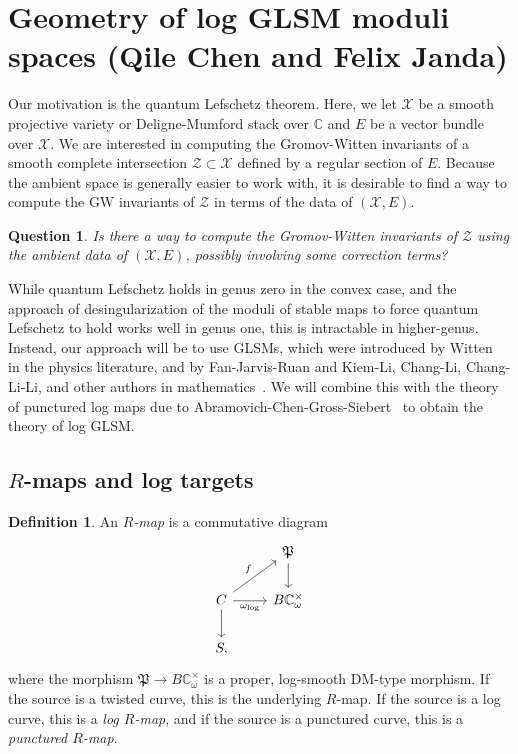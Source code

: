 \documentclass[10pt]{amsart}
\newtheorem{quest}[thm]{Question}
\theoremstyle{definition}
\newtheorem{defn}[thm]{Definition}
\theoremstyle{remark}
\theoremstyle{plain}
\theoremstyle{definition}
\theoremstyle{remark}
\newcommand{\C}{\mathbb{C}}
\newcommand{\mc}[1]{\mathcal{#1}}
\newcommand{\mf}[1]{\mathfrak{#1}}
\newcommand{\1}{\mathbf{1}}
\newcommand{\2}{\mathbf{2}}
\newcommand{\3}{\mathbf{3}}
\begin{document}
\section{Geometry of log GLSM moduli spaces (Qile Chen and Felix Janda)}%
\label{sec:Foundationslogglsm}

Our motivation is the quantum Lefschetz theorem. Here, we let $\mc{X}$ be a smooth projective variety or Deligne-Mumford stack over $\C$ and $E$ be a vector bundle over $\mc{X}$. We are interested in computing the Gromov-Witten invariants of a smooth complete intersection $\mc{Z} \subset \mc{X}$ defined by a regular section of $E$. Because the ambient space is generally easier to work with, it is desirable to find a way to compute the GW invariants of $\mc{Z}$ in terms of the data of $(\mc{X}, E)$.

\begin{quest}
    Is there a way to compute the Gromov-Witten invariants of $\mc{Z}$ using the ambient data of $(\mc{X}, E)$, possibly involving some correction terms?
\end{quest}

While quantum Lefschetz holds in genus zero in the convex case, and the approach of desingularization of the moduli of stable maps to force quantum Lefschetz to hold works well in genus one, this is intractable in higher-genus. Instead, our approach will be to use GLSMs, which were introduced by Witten~\cite{mirrorandglsm} in the physics literature, and by Fan-Jarvis-Ruan and Kiem-Li, Chang-Li, Chang-Li-Li, and other authors in mathematics~\cite{glsm,cosection,pfieldschangli,wittencosection}. We will combine this with the theory of punctured log maps due to Abramovich-Chen-Gross-Siebert~\cite{puncturedlog} to obtain the theory of log GLSM.

\subsection{$R$-maps and log targets}%
\label{sub:R-maps}

\begin{defn}
    An \textit{$R$-map} is a commutative diagram
    \begin{equation*}
    \begin{tikzcd}
        & \mf{P} \ar{d} \\
        C \ar{d} \ar{ur}{f} \ar[swap]{r}{\omega_{\log}} & B \C^{\times}_{\omega} \\
        S,
    \end{tikzcd}
    \end{equation*}
    where the morphism $\mf{P} \to B\C_{\omega}^{\times}$ is a proper, log-smooth DM-type morphism. If the source is a twisted curve, this is the underlying $R$-map. If the source is a log curve, this is a \textit{log $R$-map}, and if the source is a punctured curve, this is a \textit{punctured $R$-map}.
\end{defn}
\end{document}
